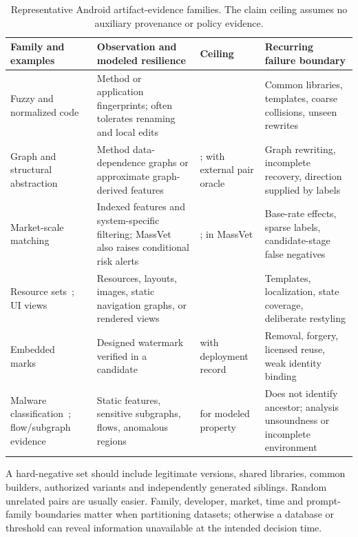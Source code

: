 \begin{table}[t]
\caption{Representative Android artifact-evidence families. The claim ceiling assumes no auxiliary provenance or policy evidence.}
\label{tab:android-families}
\small
\begin{tabularx}{\textwidth}{L{2.45cm}Y L{1.35cm}Y}
\toprule
Family and examples & Observation and modeled resilience & Ceiling & Recurring failure boundary \\
\midrule
Fuzzy and normalized code~\cite{droidmoss,codematch} & Method or application fingerprints; often tolerates renaming and local edits &  & Common libraries, templates, coarse collisions, unseen rewrites \\
Graph and structural abstraction~\cite{attackclones,andarwin} & Method data-dependence graphs or approximate graph-derived features & ;  with external pair oracle & Graph rewriting, incomplete recovery, direction supplied by labels \\
Market-scale matching~\cite{massvet,wukong,accuracyclone} & Indexed features and system-specific filtering; MassVet also raises conditional risk alerts & ;  in MassVet & Base-rate effects, sparse labels, candidate-stage false negatives \\
Resource sets~\cite{resourcedriven,resourceeval}; UI views~\cite{viewdroid,droideagle} & Resources, layouts, images, static navigation graphs, or rendered views &  & Templates, localization, state coverage, deliberate restyling \\
Embedded marks~\cite{appink} & Designed watermark verified in a candidate &  with deployment record & Removal, forgery, licensed reuse, weak identity binding \\
Malware classification~\cite{drebin,mamadroid,heterogeneity}; flow/subgraph evidence~\cite{flowdroid,dapasa} & Static features, sensitive subgraphs, flows, anomalous regions &  for modeled property & Does not identify ancestor; analysis unsoundness or incomplete environment \\
\bottomrule
\end{tabularx}
\end{table}

A hard-negative set should include legitimate versions, shared libraries, common builders, authorized variants and independently generated siblings. Random unrelated pairs are usually easier. Family, developer, market, time and prompt-family boundaries matter when partitioning datasets; otherwise a database or threshold can reveal information unavailable at the intended decision time.

